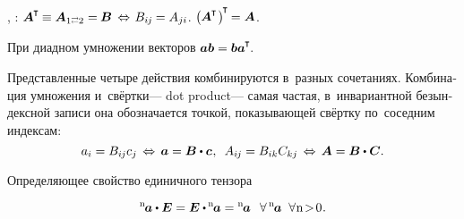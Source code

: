 \begin{otherlanguage}{russian}
,
:
${\bm{A}^{\hspace{-0.05em}\T} \hspace{-0.15ex} \equiv \bm{A}_{1 \scalebox{0.6}[0.8]{$\rightleftarrows$} 2} = \hspace{-0.1ex} \bm{B}
\hspace{.4ex}\Leftrightarrow\hspace{.25ex}
B_{i\hspace{-0.1ex}j} \hspace{-0.1ex} = A_{ji}}$.
${\bigl( \hspace{-0.1ex} \bm{A}^{\hspace{-0.05em}\T} \hspace{.15ex} \bigr)^{\hspace{-0.25ex}\T} \hspace{-0.2ex} = \bm{A}}$.

При диадном умножении векторов ${\bm{a} \bm{b} = \bm{b} \bm{a} ^{\hspace{-0.05em}\T}\hspace{-0.4ex}}$.

Представленные четыре действия комбинируются в~разных сочетаниях. Комбинация умножения и~свёртки\:--- dot product\:--- самая частая, в~инвариантной безындексной записи она обозначается точкой, показывающей свёртку по~соседним индексам:
\begin{equation}
a_i = B_{i\hspace{-0.1ex}j} c_j \,\Leftrightarrow\, \bm{a} = \bm{B} \dotp \bm{c} \hspace{.1ex}, \;\:
A_{i\hspace{-0.1ex}j} = B_{ik} C_{kj} \,\Leftrightarrow\, \bm{A} = \bm{B} \dotp \bm{C}.
\end{equation}

Определяющее свойство единичного тензора

\nopagebreak\vspace{-0.15em}\begin{equation}\label{identifyofidentitytensor}
{^\mathrm{n}\hspace{-0.2ex}\bm{a}} \dotp \bm{E} = \bm{E} \dotp \hspace{-0.15ex} {^\mathrm{n}\hspace{-0.2ex}\bm{a}} = {^\mathrm{n}\hspace{-0.2ex}\bm{a}} \;\:\:
\forall \, {^\mathrm{n}\hspace{-0.2ex}\bm{a}} \;\; \forall \hspace{.1ex} \mathrm{n \!>\! 0}
\hspace{.1ex}.
\end{equation}


\end{otherlanguage}
